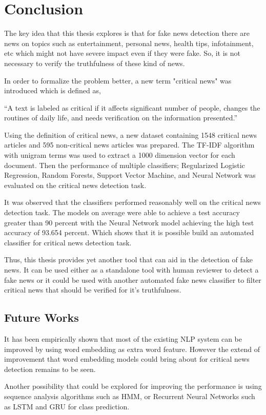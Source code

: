 \chapter{Conclusion}\label{conclusion}
The key idea that this thesis explores is that for fake news detection there are news on topics such as entertainment, personal news, health tips, infotainment, etc which might not have severe impact even if they were fake. So, it is not necessary to verify the truthfulness of these kind of news. 

In order to formalize the problem better, a new term "critical news" was introduced which is defined as,

\enquote{A text is labeled as critical if it affects significant number of people, changes the routines of daily life, and needs verification on the information presented.}

Using the definition of critical news, a new dataset containing 1548 critical news articles and 595 non-critical news articles was prepared. The TF-IDF algorithm with unigram terms was used to extract a 1000 dimension vector for each document. Then the performance of multiple classifiers; Regularized Logistic Regression, Random Forests, Support Vector Machine, and Neural Network was evaluated on the critical news detection task.

It was observed that the classifiers performed reasonably well on the critical news detection task. The models on average were able to achieve a test accuracy greater than 90 percent with the Neural Network model achieving the high test accuracy of 93.654 percent. Which shows that it is possible build an automated classifier for critical news detection task.

Thus, this thesis provides yet another tool that can aid in the detection of fake news. It can be used either as a standalone tool with human reviewer to detect a fake news or it could be used with another automated fake news classifier to filter critical news that should be verified for it's truthfulness.

\section{Future Works}
It has been empirically shown that most of the existing NLP system can be improved by using word embedding as extra word feature\cite{turian2010word}. However the extend of improvement that word embedding models could bring about for critical news detection remains to be seen.

Another possibility that could be explored for improving the performance is using sequence analysis algorithms such as HMM\cite{baum1966statistical}, or Recurrent Neural Networks such as LSTM\cite{hochreiter1997long} and GRU\cite{cho2014learning} for class prediction.
